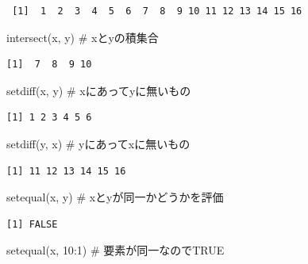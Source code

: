 \documentclass[
  letterpaper,
  DIV=11,
  numbers=noendperiod]{scrreprt}
\newenvironment{Shaded}{\begin{snugshade}}{\end{snugshade}}
\newcommand{\CommentTok}[1]{\textcolor[rgb]{0.37,0.37,0.37}{#1}}
\newcommand{\DecValTok}[1]{\textcolor[rgb]{0.68,0.00,0.00}{#1}}
\newcommand{\FunctionTok}[1]{\textcolor[rgb]{0.28,0.35,0.67}{#1}}
\newcommand{\NormalTok}[1]{\textcolor[rgb]{0.00,0.23,0.31}{#1}}
\newcommand{\SpecialCharTok}[1]{\textcolor[rgb]{0.37,0.37,0.37}{#1}}
\begin{document}
\begin{verbatim}
 [1]  1  2  3  4  5  6  7  8  9 10 11 12 13 14 15 16
\end{verbatim}

\begin{Shaded}
\begin{Highlighting}[]
\FunctionTok{intersect}\NormalTok{(x, y) }\CommentTok{\# xとyの積集合}
\end{Highlighting}
\end{Shaded}

\begin{verbatim}
[1]  7  8  9 10
\end{verbatim}

\begin{Shaded}
\begin{Highlighting}[]
\FunctionTok{setdiff}\NormalTok{(x, y) }\CommentTok{\# xにあってyに無いもの}
\end{Highlighting}
\end{Shaded}

\begin{verbatim}
[1] 1 2 3 4 5 6
\end{verbatim}

\begin{Shaded}
\begin{Highlighting}[]
\FunctionTok{setdiff}\NormalTok{(y, x) }\CommentTok{\# yにあってxに無いもの}
\end{Highlighting}
\end{Shaded}

\begin{verbatim}
[1] 11 12 13 14 15 16
\end{verbatim}

\begin{Shaded}
\begin{Highlighting}[]
\FunctionTok{setequal}\NormalTok{(x, y) }\CommentTok{\# xとyが同一かどうかを評価}
\end{Highlighting}
\end{Shaded}

\begin{verbatim}
[1] FALSE
\end{verbatim}

\begin{Shaded}
\begin{Highlighting}[]
\FunctionTok{setequal}\NormalTok{(x, }\DecValTok{10}\SpecialCharTok{:}\DecValTok{1}\NormalTok{) }\CommentTok{\# 要素が同一なのでTRUE}
\end{Highlighting}
\end{Shaded}
\end{document}
